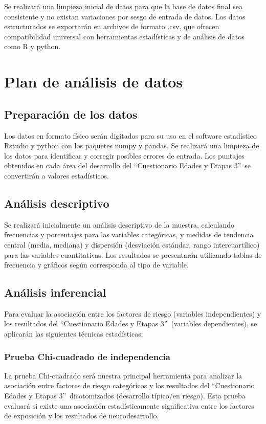 \documentclass[11pt,letterpaper]{report}
\newcommand{\asq}{“Cuestionario Edades y Etapas 3”}
\begin{document}
Se realizará una limpieza inicial de datos para que la base de datos final sea
consistente y no existan variaciones por sesgo de entrada de datos. Los datos
estructurados se exportarán en archivos de formato .csv, que ofrecen
compatibilidad universal con herramientas estadísticas y de análisis de datos
como R y python.

\section{Plan de análisis de datos}
\subsection{Preparación de los datos}
Los datos en formato físico serán digitados para su uso en el software
estadístico Rstudio y python con los paquetes numpy y pandas. Se realizará una
limpieza de los datos para identificar y corregir posibles errores de entrada.
Los puntajes obtenidos en cada área del desarrollo del \asq\ se convertirán a
valores estadísticos. 
	
\subsection{Análisis descriptivo}
Se realizará inicialmente un análisis descriptivo de la muestra, calculando
frecuencias y porcentajes para las variables categóricas, y medidas de
tendencia central (media, mediana) y dispersión (desviación estándar, rango
intercuartílico) para las variables cuantitativas. Los resultados se
presentarán utilizando tablas de frecuencia y gráficos según corresponda al
tipo de variable.

\subsection{Análisis inferencial}
Para evaluar la asociación entre los factores de riesgo (variables
independientes) y los resultados del \asq\ (variables dependientes), se
aplicarán las siguientes técnicas estadísticas:

\subsubsection{Prueba Chi-cuadrado de independencia}
La prueba Chi-cuadrado será nuestra principal herramienta para analizar la
asociación entre factores de riesgo categóricos y los resultados del \asq\
dicotomizados (desarrollo típico/en riesgo). Esta prueba evaluará si existe una
asociación estadísticamente significativa entre los factores de exposición y
los resultados de neurodesarrollo.
\end{document}
